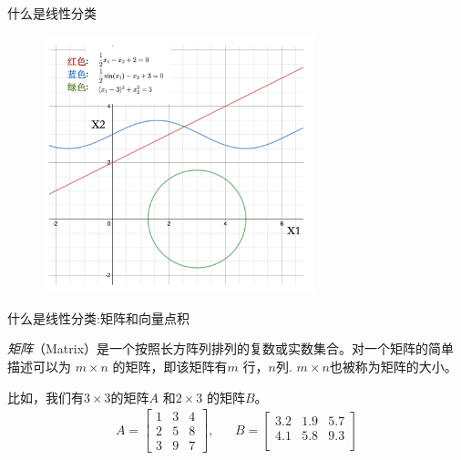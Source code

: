 \documentclass[handout]{ctexbeamer}
\begin{document}
\begin{frame}{什么是线性分类}
\begin{figure}[H]
	\centering
	\includegraphics[width=0.7\textwidth]{fig/C2C2linear}
\end{figure}	
\end{frame}

\begin{frame}{什么是线性分类:矩阵和向量点积}
\begin{definition}
	\textit{矩阵}（Matrix）是一个按照长方阵列排列的复数或实数集合。对一个矩阵的简单描述可以为 $m \times n$ 的矩阵，即该矩阵有$m$ 行，$n$列. $m \times n$也被称为矩阵的大小。
\end{definition}

\begin{example}
比如，我们有$3 \times 3 $的矩阵$A$ 和$2 \times 3$ 的矩阵$B$。
\begin{align*}
	 A = \begin{bmatrix}
	1 & 3 & 4 \\
	2 & 5 & 8 \\
	3 & 9 & 7
\end{bmatrix}, & & B = \begin{bmatrix}
	3.2 & 1.9 & 5.7 \\
	4.1 & 5.8 & 9.3 \\
\end{bmatrix}
\end{align*}	
\end{example}
\end{frame}
\end{document}
